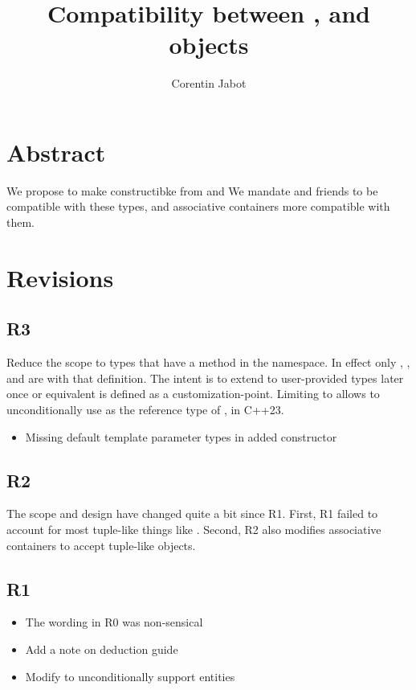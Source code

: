 \documentclass{wg21}
\title{Compatibility between \tcode{tuple}, \tcode{pair} and \placeholder{tuple-like} objects}
\author{Corentin Jabot}{corentin.jabot@gmail.com}
\begin{document}
\maketitle


\section{Abstract}

We propose to make  constructibke from  and 
We mandate  and friends to be compatible with these types, 
and associative containers more compatible with them.

\section{Revisions}

\subsection{R3}

Reduce the scope to types that have a  method in the  namespace.
In effect only , ,  and  are 
with that definition.
The intent is to extend to user-provided types later once  or equivalent is defined as a customization-point.
Limiting to  allows to unconditionally use  as the reference type of ,  in C++23.

\begin{itemize}
\item Missing default template parameter types in added  constructor
\end{itemize}



\subsection{R2}

The scope and design have changed quite a bit since R1. First, R1 failed to account for most tuple-like things like .
Second, R2 also modifies associative containers to accept tuple-like objects.

\subsection{R1}
\begin{itemize}
    \item The wording in R0 was non-sensical
    \item Add a note on deduction guide
    \item Modify  to unconditionally support  entities
\end{itemize}
\end{document}
